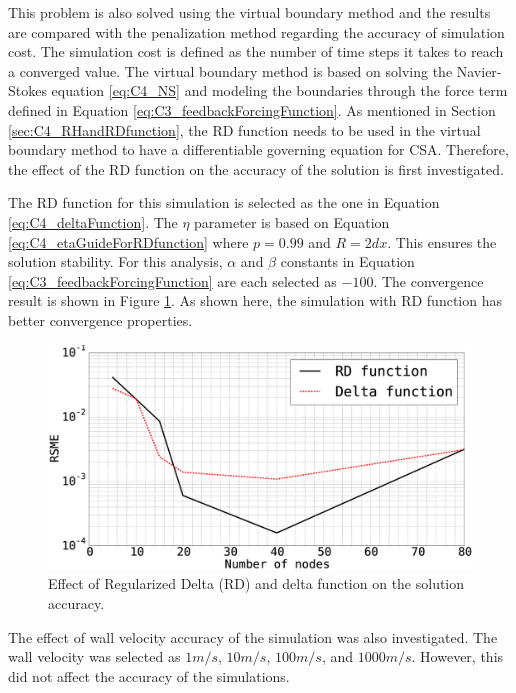 This problem is also solved using the virtual boundary method and the results are compared with the penalization method regarding the accuracy of simulation cost. The simulation cost is defined as the number of time steps it takes to reach a converged value. The virtual boundary method is based on solving the Navier-Stokes equation \eqref{eq:C4_NS} and modeling the boundaries through the force term defined in Equation \eqref{eq:C3_feedbackForcingFunction}. As mentioned in Section \ref{sec:C4_RHandRDfunction}, the RD function needs to be used in the virtual boundary method to have a differentiable governing equation for CSA. Therefore, the effect of the RD function on the accuracy of the solution is first investigated.

The RD function for this simulation is selected as the one in Equation \eqref{eq:C4_deltaFunction}. The $\eta$ parameter is based on Equation \eqref{eq:C4_etaGuideForRDfunction} where $p = 0.99$ and $R = 2dx$. This ensures the solution stability. For this analysis, $\alpha$ and $\beta$ constants in Equation \eqref{eq:C3_feedbackForcingFunction} are each selected as $-100$. The convergence result is shown in Figure \ref{fig:C4_virtualBoundary_RDvsD}. As shown here, the simulation with RD function has better convergence properties.

\begin{figure}[H]
    \centering
    \includegraphics[width=12.00cm]{Chapter_4/figure/effect_of_RD_on_simulation_vs_numberOfNodes_1D_problem.eps}
    \caption{Effect of Regularized Delta (RD) and delta function on the solution accuracy.}
    \label{fig:C4_virtualBoundary_RDvsD}
\end{figure}

The effect of wall velocity accuracy of the simulation was also investigated. The wall velocity was selected as $1 m/s$, $10 m/s$, $100 m/s$, and $1000 m/s$. However, this did not affect the accuracy of the simulations.

